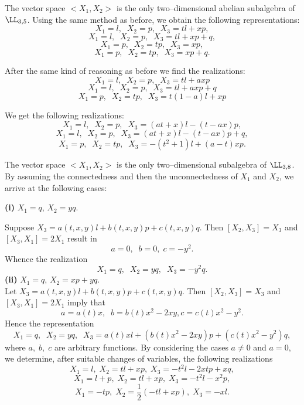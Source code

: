 The vector space $<X_1,X_2>$  is the only two--dimensional abelian subalgebra of
$\LL _{3,5}$. Using the same method as before, we obtain the following
representations: \[X_1=l,\;\;X_2=p,\;\;X_3=tl+xp,\]
\[X_1=l,\;\;X_2=p,\;\;X_3=tl+xp+q,\] \[X_1=p,\;\;X_2=tp,\;\;X_3=xp,\]
\[X_1=p,\;\;X_2=tp,\;\;X_3=xp+q.\]
\T{{\bf $\LL _{3,6}^{a},\;\; a\in [-1,1)
$: $[X_1,X_3]=X_1$, $[X_2,X_3]=aX_2.$}}

After the same kind of reasoning as before we find the realizations:
\[X_1=l,\;\;X_2=p,\;\;X_3=tl+axp\] \[X_1=l,\;\;X_2=p,\;\;X_3=tl+axp+q\]
\[X_1=p,\;\;X_2=tp,\;\;X_3=t(1-a)l+xp\]

We get the following realizations:
\[X_1=l,\;\; X_2=p,\;\;X_3=(at+x)l-(t-ax)p,\]
\[X_1=l,\;\;X_2=p,\;\;X_3=(at+x)l-(t-ax)p+q,\]
\[X_1=p,\;\;X_2=tp,\;\;X_3=-(t^2+1)l+(a-t)xp.\]

The vector space $<X_1,X_2>$ is
the only two--dimensional subalgebra of $\LL _{3,8}$. By assuming the
connectedness and then the unconnectedness of $X_1$ and $X_2$, we arrive
at the following cases:

{\bf (i)} $X_1=q$, $X_2=yq.$

Suppose
$X_3=a(t,x,y)l+b(t,x,y)p+c(t,x,y)q$. Then $[X_2,X_3]=X_3$ and
$[X_3,X_1]=2X_1$ result in \[a=0,\;\;b=0,\;c=-y^2.\] Whence the
realization \[X_1=q,\;\;X_2=yq,\;\;X_3=-y^2q.\] {\bf (ii)} $X_1=q$,
$X_2=xp+yq.$\\ Let $X_3=a(t,x,y)l+b(t,x,y)p+c(t,x,y)q$. Then
$[X_2,X_3]=X_3$ and $[X_3,X_1]=2X_1$ imply that
\[a=a(t)x,\;\;b=b(t)x^2-2xy,c=c(t)x^2-y^2.\] Hence the representation
\[X_1=q,\;\;X_2=yq,\;\;X_3=a(t)xl+\left (b(t)x^2-2xy\right)p +\left (
c(t)x^2-y^2 \right )q,\] where $a,\;b,\; c$ are arbitrary functions. By
considering the cases $a\ne 0$ and $a=0$, we determine, after suitable changes
of variables, the following realizations
\[X_1=l,\;X_2=tl+xp,\;X_3=-t^2l-2xtp+xq,\]
\[X_1=l+p,\;X_2=tl+xp,\;X_3=-t^2l-x^2p,\]
\[X_1=-tp,\;X_2=\frac{1}{2}(-tl+xp),\;X_3=-xl.\]

